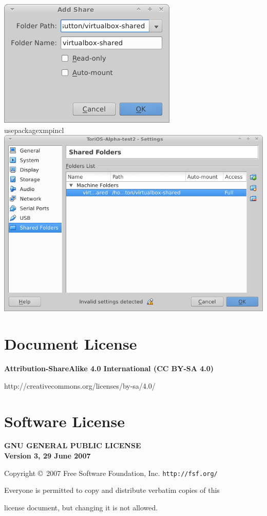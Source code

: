 \documentclass[12pt,a4paper]{book}
\begin{document}
\includegraphics[width=0.7\linewidth]{screen-shots/virtualbox-shared-folder}\\usepackage{xmpincl}
\includegraphics[width=0.7\linewidth]{screen-shots/virtualbox-shared-folders}\\

\chapter{Document License}
\textbf{Attribution-ShareAlike 4.0 International (CC BY-SA 4.0)}


http://creativecommons.org/licenses/by-sa/4.0/



\chapter{Software License}

\begin{center}
{\parindent 0in

\begin{center} 
\textbf{GNU GENERAL PUBLIC LICENSE} \\
\textbf{Version 3, 29 June 2007} \\
\end{center}

Copyright \copyright\  2007 Free Software Foundation, Inc. \texttt{http://fsf.org/}

\bigskip
Everyone is permitted to copy and distribute verbatim copies of this

license document, but changing it is not allowed.}

\end{center}
\end{document}
